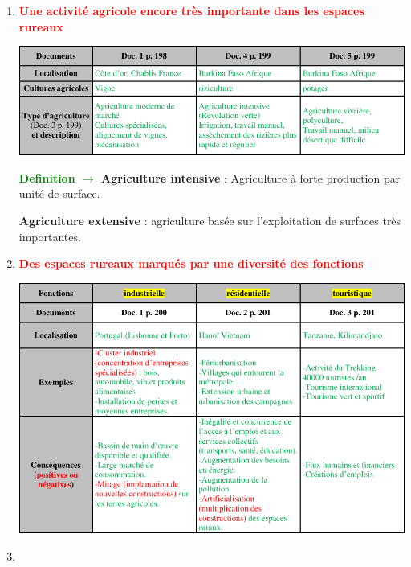 \documentclass[12pt,a4paper]{article}
\begin{document}
\begin{enumerate}[label=\Roman*.,font=\color{red}]
\item	\textcolor{red}{\textbf{Une activité agricole encore très importante dans les espaces rureaux}}
\begin{center}
\includegraphics[scale=0.5]{I_G3.png}
\end{center}

\textbf{\textcolor{green}{Definition $\rightarrow$ }
Agriculture intensive} : Agriculture à forte production par unité de surface.\par
\textbf{Agriculture extensive} : agriculture basée sur l’exploitation de surfaces très importantes.\par


\item \textcolor{red}{\textbf{Des espaces rureaux marqués par une diversité des fonctions }}
\begin{center}
\includegraphics[scale=0.5]{II_G3.png}
\end{center}
\item \textcolor{red}{\textbf{															}}



\end{enumerate}
\end{document}
